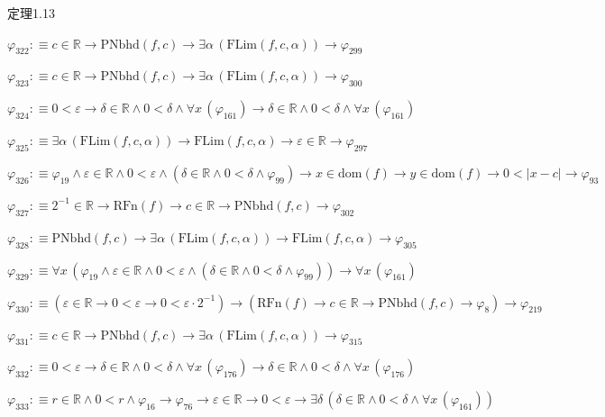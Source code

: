 \begin{fullproof}{定理1.13}
\begin{abbrevlist}
\item $\varphi_{322} :\equiv c \in \mathbb{R} \to \mathrm{PNbhd}(f,c) \to \exists \alpha\,(\mathrm{FLim}(f,c,\alpha)) \to \varphi_{299}$
\item $\varphi_{323} :\equiv c \in \mathbb{R} \to \mathrm{PNbhd}(f,c) \to \exists \alpha\,(\mathrm{FLim}(f,c,\alpha)) \to \varphi_{300}$
\item $\varphi_{324} :\equiv 0 < \varepsilon \to \delta \in \mathbb{R} \land 0 < \delta \land \forall x\,(\varphi_{161}) \to \delta \in \mathbb{R} \land 0 < \delta \land \forall x\,(\varphi_{161})$
\item $\varphi_{325} :\equiv \exists \alpha\,(\mathrm{FLim}(f,c,\alpha)) \to \mathrm{FLim}(f,c,\alpha) \to \varepsilon \in \mathbb{R} \to \varphi_{297}$
\item $\varphi_{326} :\equiv \varphi_{19} \land \varepsilon \in \mathbb{R} \land 0 < \varepsilon \land (\delta \in \mathbb{R} \land 0 < \delta \land \varphi_{99}) \to x \in \mathrm{dom}(f) \to y \in \mathrm{dom}(f) \to 0 < \lvert x - c \rvert \to \varphi_{93}$
\item $\varphi_{327} :\equiv 2^{-1} \in \mathbb{R} \to \mathrm{RFn}(f) \to c \in \mathbb{R} \to \mathrm{PNbhd}(f,c) \to \varphi_{302}$
\item $\varphi_{328} :\equiv \mathrm{PNbhd}(f,c) \to \exists \alpha\,(\mathrm{FLim}(f,c,\alpha)) \to \mathrm{FLim}(f,c,\alpha) \to \varphi_{305}$
\item $\varphi_{329} :\equiv \forall x\,(\varphi_{19} \land \varepsilon \in \mathbb{R} \land 0 < \varepsilon \land (\delta \in \mathbb{R} \land 0 < \delta \land \varphi_{99})) \to \forall x\,(\varphi_{161})$
\item $\varphi_{330} :\equiv (\varepsilon \in \mathbb{R} \to 0 < \varepsilon \to 0 < \varepsilon \cdot 2^{-1}) \to (\mathrm{RFn}(f) \to c \in \mathbb{R} \to \mathrm{PNbhd}(f,c) \to \varphi_{8}) \to \varphi_{219}$
\item $\varphi_{331} :\equiv c \in \mathbb{R} \to \mathrm{PNbhd}(f,c) \to \exists \alpha\,(\mathrm{FLim}(f,c,\alpha)) \to \varphi_{315}$
\item $\varphi_{332} :\equiv 0 < \varepsilon \to \delta \in \mathbb{R} \land 0 < \delta \land \forall x\,(\varphi_{176}) \to \delta \in \mathbb{R} \land 0 < \delta \land \forall x\,(\varphi_{176})$
\item $\varphi_{333} :\equiv r \in \mathbb{R} \land 0 < r \land \varphi_{16} \to \varphi_{76} \to \varepsilon \in \mathbb{R} \to 0 < \varepsilon \to \exists \delta\,(\delta \in \mathbb{R} \land 0 < \delta \land \forall x\,(\varphi_{161}))$

\end{abbrevlist}
\end{fullproof}
